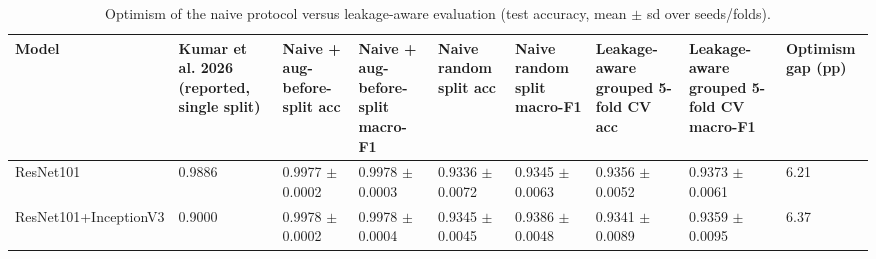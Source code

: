 \begin{table}[ht]
\centering
\small
\caption{Optimism of the naive protocol versus leakage-aware evaluation (test accuracy, mean $\pm$ sd over seeds/folds).}
\label{tab:tab2_optimism_gap}
\begin{tabular}{lllllllll}
\hline
Model & Kumar et al. 2026 (reported, single split) & Naive + aug-before-split acc & Naive + aug-before-split macro-F1 & Naive random split acc & Naive random split macro-F1 & Leakage-aware grouped 5-fold CV acc & Leakage-aware grouped 5-fold CV macro-F1 & Optimism gap (pp) \\
\hline
ResNet101 & 0.9886 & 0.9977 $\pm$ 0.0002 & 0.9978 $\pm$ 0.0003 & 0.9336 $\pm$ 0.0072 & 0.9345 $\pm$ 0.0063 & 0.9356 $\pm$ 0.0052 & 0.9373 $\pm$ 0.0061 & 6.21 \\
ResNet101+InceptionV3 & 0.9000 & 0.9978 $\pm$ 0.0002 & 0.9978 $\pm$ 0.0004 & 0.9345 $\pm$ 0.0045 & 0.9386 $\pm$ 0.0048 & 0.9341 $\pm$ 0.0089 & 0.9359 $\pm$ 0.0095 & 6.37 \\
\hline
\end{tabular}
\end{table}